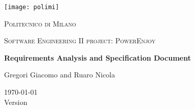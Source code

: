 \centering
\texttt{[image: polimi]}\\\vspace{0.25cm}
{\scshape\LARGE Politecnico di Milano\par}\vspace{0.25cm}
{\scshape\Large Software Engineering II project: PowerEnjoy\par}\vspace{1.5cm}
{\huge\bfseries Requirements Analysis and Specification Document\par}\vspace{1cm}
{\large Gregori Giacomo and Ruaro Nicola\par}\vfill

{\large \today \\Version \version}
